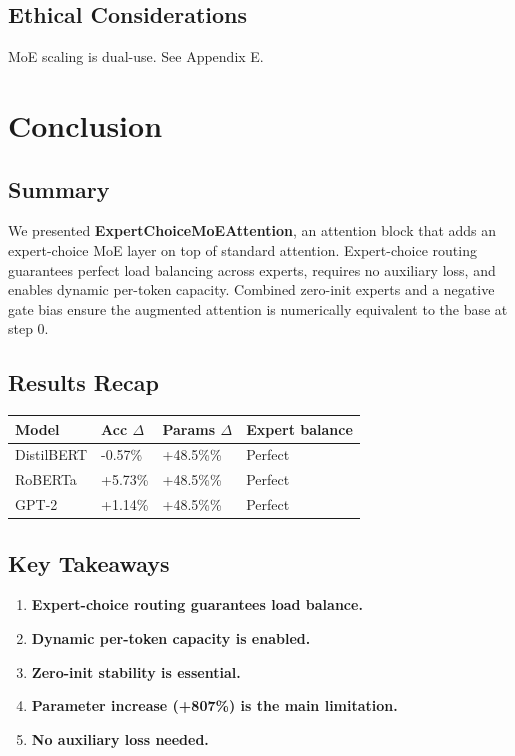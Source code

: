 \subsection{Ethical Considerations}

MoE scaling is dual-use. See Appendix E.



\section{Conclusion}

\subsection{Summary}

We presented \textbf{ExpertChoiceMoEAttention}, an attention block that adds an 
expert-choice MoE layer on top of standard attention. Expert-choice routing 
guarantees perfect load balancing across experts, requires no auxiliary 
loss, and enables dynamic per-token capacity. Combined zero-init experts 
and a negative gate bias ensure the augmented attention is numerically 
equivalent to the base at step 0.

\subsection{Results Recap}

\begin{table}[H]
\centering
\small
\begin{tabular}{llll}
\toprule
\textbf{Model} & \textbf{Acc $\Delta$} & \textbf{Params $\Delta$} & \textbf{Expert balance} \\
\midrule
DistilBERT & -0.57\% & +48.5\%\% & Perfect \\
RoBERTa & +5.73\% & +48.5\%\% & Perfect \\
GPT-2 & +1.14\% & +48.5\%\% & Perfect \\
\bottomrule
\end{tabular}
\end{table}

\subsection{Key Takeaways}

\begin{enumerate}
\item \textbf{Expert-choice routing guarantees load balance.}
\item \textbf{Dynamic per-token capacity is enabled.}
\item \textbf{Zero-init stability is essential.}
\item \textbf{Parameter increase (+807\%) is the main limitation.}
\item \textbf{No auxiliary loss needed.}

\end{enumerate}
